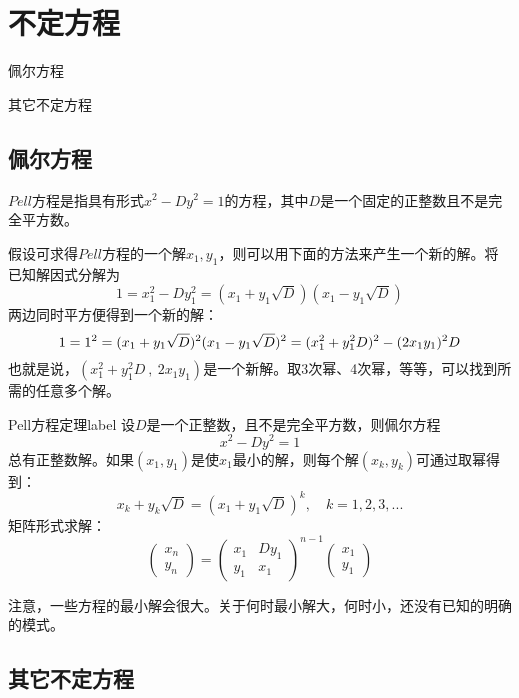 \chapter{不定方程}

\begin{introduction}
	\item 佩尔方程
	\item 其它不定方程
\end{introduction}

\section{佩尔方程}
$Pell$方程是指具有形式$x^2-Dy^2=1$的方程，其中$D$是一个固定的正整数且{\heiti 不是完全平方数}。

假设可求得$Pell$方程的一个解$x_1,y_1$，则可以用下面的方法来产生一个新的解。将已知解因式分解为
$$
1=x_1^2-Dy_1^2=(x_1+y_1\sqrt{D})(x_1-y_1\sqrt{D})
$$
两边同时平方便得到一个新的解：
$$
1=1^2=(x_1+y_1\sqrt{D})^2(x_1-y_1\sqrt{D})^2\\
=(x_1^2+y_1^2D)^2-(2x_1y_1)^2D
$$
也就是说，$(x_1^2+y_1^2D\ ,\ 2x_1y_1)$是一个新解。取3次幂、4次幂，等等，可以找到所需的任意多个解。

\begin{theorem}{Pell方程定理}{label}
设$D$是一个正整数，且不是完全平方数，则佩尔方程
$$
x^2-Dy^2=1
$$
总有正整数解。如果$(x_1,y_1)$是使$x_1$最小的解，则每个解$(x_k,y_k)$可通过取幂得到：
$$
x_k+y_k\sqrt{D}=(x_1+y_1\sqrt{D})^k ,\quad k=1,2,3,...
$$
矩阵形式求解：
$$
\left(\begin{array}{l}{x_{n}} \\ {y_{n}}\end{array}\right)=\left(\begin{array}{ll}{x_{1}} & {D y_{1}} \\ {y_{1}} & {x_{1}}\end{array}\right)^{n-1}\left(\begin{array}{l}{x_{1}} \\ {y_{1}}\end{array}\right)
$$
\end{theorem}
\begin{note}
注意，一些方程的最小解会很大。关于何时最小解大，何时小，还没有已知的明确的模式。
\end{note}


\section{其它不定方程}

